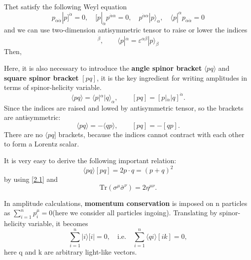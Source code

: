 \documentclass[12pt]{article}
\numberwithin{equation}{section}
\newcommand{\avg}[1]{\langle #1 \rangle}
\newcommand{\aket}[1]{|#1\rangle}
\newcommand{\sket}[1]{|#1]}
\newcommand{\cbrak}[2]{\avg{#1}\![#2]}
\begin{document}
Thet satisfy the following Weyl equation
\begin{equation}
    p_{\alpha\dot{\alpha}}\sket{p}^{\dot{\alpha}}=0,\quad [p|_{\dot{\alpha}}p^{\dot{\alpha}\alpha}=0,\quad p^{\dot{\alpha}\alpha}\aket{p}_\alpha,\quad \langle p|^\alpha p_{\alpha\dot{\alpha}}=0
\end{equation}
and we can use two-dimension antisymmetric tensor to raise or lower the indices
\begin{equation}
    [p|_{\dot{\alpha}}=\varepsilon _{\dot{\alpha}\dot{\beta}}\sket{p}^{\dot{\beta}},\qquad \langle p|^\alpha=\varepsilon^{\alpha\beta}\aket{p}_{\beta}
\end{equation}
\noindent
Then,


\vspace{1em}
Here, it is also necessary to introduce the \textbf{angle spinor bracket} $\avg{pq}$ and \textbf{square spinor bracket} $[pq]$, it is the key ingredient for writing amplitudes in terms of spinor-helicity variable.
\begin{equation}
    \avg{pq}=\langle p|^\alpha \aket{q}_\alpha,\qquad [pq]=[p|_{\dot{\alpha}}|q]^{\dot{\alpha}}.
\end{equation}
Since the indices are raised and lowed by antisymmetric tensor, so the brackets are antisymmetric:
\begin{equation}
    \avg{pq}=-\avg{qp},\qquad [pq]=-[qp].
\end{equation}
There are no $\langle pq]$ brackets, because the indices cannot contract with each other to form a Lorentz scalar.

It is very easy to derive the following important relation:
\begin{equation}
    \cbrak{pq}{pq}=2p\cdot q= (p+q)^2
\end{equation}
by using \eqref{2.1} and 
\begin{equation*}
    \mathrm{Tr}(\sigma^\mu \bar{\sigma}^\nu)=2\eta^{\mu\nu}.
\end{equation*}

In amplitude calculations, \textbf{momentum conservation} is imposed on n particles as $\sum_{i=1}^{n}p_i^\mu=0$(here we consider all particles ingoing). Translating by 
spinor-helicity variable, it becomes
\begin{equation}
   \sum_{i=1}^{n}\aket{i}[i|=0,\quad \text{i.e.}\quad \sum_{i=1}^{n}\cbrak{qi}{ik}=0,
\end{equation}
here q and k are arbitrary light-like vectors.
\end{document}
